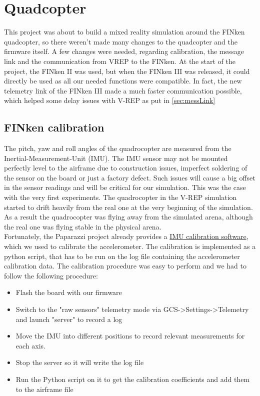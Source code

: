 \section{Quadcopter}
\label{sec:finken}
This project was about to build a mixed reality simulation around the FINken quadcopter, so there weren't made many changes to the quadcopter and the firmware itself. A few changes were needed, regarding calibration, the message link and the communication from VREP to the FINken. At the start of the project, the FINken II was used, but when the FINken III was released, it could directly be used as all our needed functions were compatible. In fact, the new telemetry link of the FINken III made a much faster communication possible, which helped some delay issues with V-REP as put in \ref{sec:messLink}
\subsection{FINken calibration}

The pitch, yaw and roll angles of the quadrocopter are measured from the Inertial-Measurement-Unit (IMU). The IMU sensor may not be mounted perfectly level to the airframe due to construction issues, imperfect soldering of the sensor on the board or just a factory defect. Such issues will cause a big offset in the sensor readings and will be critical for our simulation.
This was the case with the very first experiments. The quadrocopter in the V-REP simulation started to drift heavily from the real one at the very beginning of the simulation. As a result the quadrocopter was flying away from the simulated arena, although the real one was flying stable in the physical arena.\\
Fortunately, the Paparazzi project already provides a \href{http://wiki.paparazziuav.org/wiki/ImuCalibration}{IMU calibration software}, which we used to calibrate the accelerometer. The calibration is implemented as a python script, that has to be run on the log file containing the accelerometer calibration data. The calibration procedure was easy to perform and we had to follow the following procedure:

\begin{itemize}
\item{Flash the board with our firmware}
\item{Switch to the "raw sensors" telemetry mode via GCS->Settings->Telemetry and launch "server" to record a log}
\item{Move the IMU into different positions to record relevant measurements for each axis. }
\item{Stop the server so it will write the log file}
\item{Run the Python script on it to get the calibration coefficients and add them to the airframe file}
\end{itemize}


